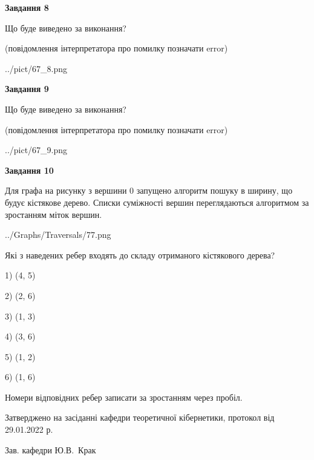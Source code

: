 \documentclass[12pt, ukrainian]{article}
\begin{document}
{\begin {large}
{\begin {center}\textbf{Завдання 8}\end {center}}\par
Що буде виведено за виконання?\par
 (повідомлення інтерпретатора про помилку позначати error)\par
\begin{center}
	{../pict/67_8.png}
\end{center}
\newpage

{\begin {center}\textbf{Завдання 9}\end {center}}\par
Що буде виведено за виконання?\par
 (повідомлення інтерпретатора про помилку позначати error)\par
\begin{center}
	{../pict/67_9.png}
\end{center}
\newpage

{\begin {center}\textbf{Завдання 10}\end {center}}\par
Для графа на рисунку з вершини 0 запущено алгоритм пошуку в ширину, що будує кістякове дерево. Списки суміжності вершин переглядаються алгоритмом за зростанням міток вершин.\par
\begin{center}
	{../Graphs/Traversals/77.png}
\end{center}
\par Які з наведених ребер входять до складу отриманого кістякового дерева?\par
1) (4, 5)\par
2) (2, 6)\par
3) (1, 3)\par
4) (3, 6)\par
5) (1, 2)\par
6) (1, 6)\par
{\vskip 15pt} Номери відповідних ребер записати за зростанням через пробіл.\par
\newpage


\end {large}
}
{\smallskip \begin {small} Затверджено на засіданні кафедри теоретичної кібернетики, протокол  від   29.01.2022 р.\par\smallskip\smallskip
{\parbox {6.5 cm}{Зав. кафедри \dotfill Ю.В.~Крак}} \end{small}}
\end{document}
